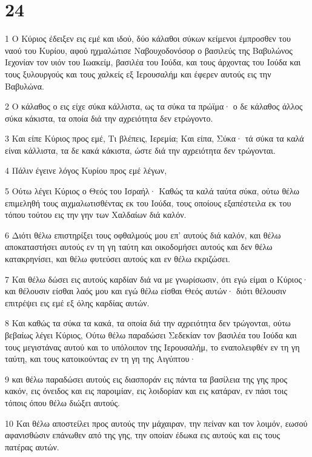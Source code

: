 \chapter{24}

\par 1 Ο Κύριος έδειξεν εις εμέ και ιδού, δύο κάλαθοι σύκων κείμενοι έμπροσθεν του ναού του Κυρίου, αφού ηχμαλώτισε Ναβουχοδονόσορ ο βασιλεύς της Βαβυλώνος Ιεχονίαν τον υιόν του Ιωακείμ, βασιλέα του Ιούδα, και τους άρχοντας του Ιούδα και τους ξυλουργούς και τους χαλκείς εξ Ιερουσαλήμ και έφερεν αυτούς εις την Βαβυλώνα.
\par 2 Ο κάλαθος ο εις είχε σύκα κάλλιστα, ως τα σύκα τα πρώϊμα· ο δε κάλαθος άλλος σύκα κάκιστα, τα οποία διά την αχρειότητα δεν ετρώγοντο.
\par 3 Και είπε Κύριος προς εμέ, Τι βλέπεις, Ιερεμία; Και είπα, Σύκα· τά σύκα τα καλά είναι κάλλιστα, τα δε κακά κάκιστα, ώστε διά την αχρειότητα δεν τρώγονται.
\par 4 Πάλιν έγεινε λόγος Κυρίου προς εμέ λέγων,
\par 5 Ούτω λέγει Κύριος ο Θεός του Ισραήλ· Καθώς τα καλά ταύτα σύκα, ούτω θέλω επιμεληθή τους αιχμαλωτισθέντας εκ του Ιούδα, τους οποίους εξαπέστειλα εκ του τόπου τούτου εις την γην των Χαλδαίων διά καλόν.
\par 6 Διότι θέλω επιστηρίξει τους οφθαλμούς μου επ' αυτούς διά καλόν, και θέλω αποκαταστήσει αυτούς εν τη γη ταύτη και οικοδομήσει αυτούς και δεν θέλω κατακρηνίσει, και θέλω φυτεύσει αυτούς και εν θέλω εκριζώσει.
\par 7 Και θέλω δώσει εις αυτούς καρδίαν διά να με γνωρίσωσιν, ότι εγώ είμαι ο Κύριος· και θέλουσιν είσθαι λαός μου και εγώ θέλω είσθαι Θεός αυτών· διότι θέλουσιν επιτρέψει εις εμέ εξ όλης καρδίας αυτών.
\par 8 Και καθώς τα σύκα τα κακά, τα οποία διά την αχρειότητα δεν τρώγονται, ούτω βεβαίως λέγει Κύριος, Ούτω θέλω παραδώσει Σεδεκίαν τον βασιλέα του Ιούδα και τους μεγιστάνας αυτού και το υπόλοιπον της Ιερουσαλήμ, το εναπολειφθέν εν τη γη ταύτη, και τους κατοικούντας εν τη γη της Αιγύπτου·
\par 9 και θέλω παραδώσει αυτούς εις διασποράν εις πάντα τα βασίλεια της γης προς κακόν, εις όνειδος και εις παροιμίαν, εις λοιδορίαν και εις κατάραν, εν πάσι τοις τόποις όπου θέλω διώξει αυτούς.
\par 10 Και θέλω αποστείλει προς αυτούς την μάχαιραν, την πείναν και τον λοιμόν, εωσού αφανισθώσιν επάνωθεν από της γης, την οποίαν έδωκα εις αυτούς και εις τους πατέρας αυτών.

